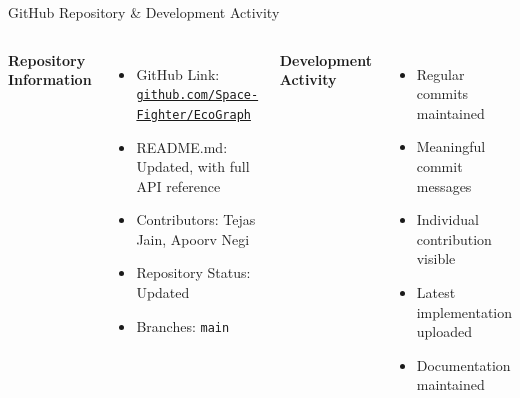 \documentclass[aspectratio=169,11pt]{beamer}
\begin{document}
\begin{frame}{GitHub Repository \& Development Activity}
\small

\begin{columns}[T,totalwidth=\textwidth]


\textbf{\color{GEUBlue}Repository Information}

\begin{itemize}\itemsep3pt
\item GitHub Link: \href{https://github.com/Space-Fighter/EcoGraph}{\texttt{github.com/Space-Fighter/EcoGraph}}
\item README.md: Updated, with full API reference
\item Contributors: Tejas Jain, Apoorv Negi
\item Repository Status: Updated
\item Branches: \texttt{main}
\end{itemize}


\textbf{\color{GEUBlue}Development Activity}

\begin{itemize}\itemsep3pt
\item Regular commits maintained
\item Meaningful commit messages
\item Individual contribution visible
\item Latest implementation uploaded
\item Documentation maintained
\end{itemize}

\end{columns}

\end{frame}
\end{document}
